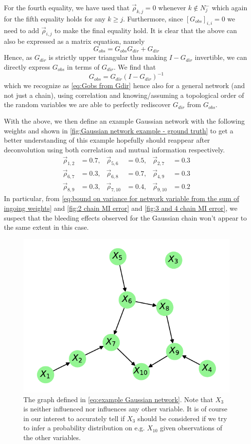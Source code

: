 \documentclass[../Thesis.tex]{subfiles}
\begin{document}
For the fourth equality, we have used that $\vec{\rho}_{k,j} = 0$ whenever $k \not\in N^-_j$ which again for the fifth equality holds for any $k \geq j$. Furthermore, since $\left[G_{obs}\right]_{i,i} = 0$ we need to add $\vec{\rho}_{i,j}$ to make the final equality hold. It is clear that the above can also be expressed as a matrix equation, namely
$$G_{obs} = G_{obs}G_{dir} + G_{dir}$$
Hence, as $G_{dir}$ is strictly upper triangular thus making $I - G_{dir}$ invertible, we can directly express $G_{obs}$ in terms of $G_{dir}$. We find that
$$G_{obs} = G_{dir} \left(I - G_{dir}\right)^{-1}$$
which we recognize as \autoref{eq:Gobs from Gdir} hence also for a general network (and not just a chain), using correlation and knowing/assuming a topological order of the random variables we are able to perfectly rediscover $G_{dir}$ from $G_{obs}$.

With the above, we then define an example Gaussian network with the following weights and shown in \autoref{fig:Gaussian network example - ground truth} to get a better understanding of this example hopefully should reappear after deconvolution using both correlation and mutual information respectively.
\begin{equation}\label{eq:example Gaussian network}
    \begin{aligned}
        \vec{\rho}_{1,2} & = 0.7, & \vec{\rho}_{5,6}  & = 0.5, & \vec{\rho}_{2,7}  & = 0.3 \\
        \vec{\rho}_{6,7} & = 0.3, & \vec{\rho}_{6,8}  & = 0.7, & \vec{\rho}_{4,9}  & = 0.3 \\
        \vec{\rho}_{8,9} & = 0.3, & \vec{\rho}_{7,10} & = 0.4, & \vec{\rho}_{9,10} & = 0.2
    \end{aligned}
\end{equation}
In particular, from \autoref{eq:bound on variance for network variable from the sum of ingoing weights} and \autoref{fig:2 chain MI error} and \autoref{fig:3 and 4 chain MI error}, we suspect that the bleeding effects observed for the Gaussian chain won't appear to the same extent in this case.
\begin{figure}[ht]
    \centering
    \includegraphics[width = .6\linewidth]{figures/Gaussian Network Theoretical/Network graph - ground truth.pdf}
    \caption{The graph defined in \autoref{eq:example Gaussian network}. Note that $X_3$ is neither influenced nor influences any other variable. It is of course in our interest to accurately tell if $X_3$ should be considered if we try to infer a probability distribution on e.g. $X_{10}$ given observations of the other variables.}
    \label{fig:Gaussian network example - ground truth}
\end{figure}
\end{document}
